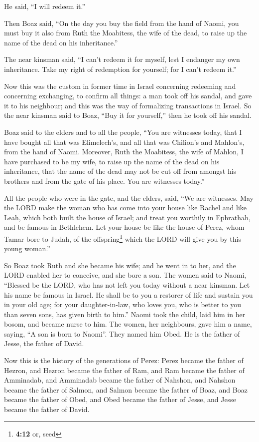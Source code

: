 He said, ``I will redeem it.''

 Then Boaz said, ``On the day you buy the field from the
hand of Naomi, you must buy it also from Ruth the Moabitess, the wife of
the dead, to raise up the name of the dead on his inheritance.''

 The near kinsman said, ``I can't redeem it for myself,
lest I endanger my own inheritance. Take my right of redemption for
yourself; for I can't redeem it.''

 Now this was the custom in former time in Israel
concerning redeeming and concerning exchanging, to confirm all things: a
man took off his sandal, and gave it to his neighbour; and this was the
way of formalizing transactions in Israel.  So the near
kinsman said to Boaz, ``Buy it for yourself,'' then he took off his
sandal.

 Boaz said to the elders and to all the people, ``You are
witnesses today, that I have bought all that was Elimelech's, and all
that was Chilion's and Mahlon's, from the hand of Naomi. 
Moreover, Ruth the Moabitess, the wife of Mahlon, I have purchased to be
my wife, to raise up the name of the dead on his inheritance, that the
name of the dead may not be cut off from amongst his brothers and from
the gate of his place. You are witnesses today.''

 All the people who were in the gate, and the elders,
said, ``We are witnesses. May the LORD make the woman who has come into
your house like Rachel and like Leah, which both built the house of
Israel; and treat you worthily in Ephrathah, and be famous in Bethlehem.
 Let your house be like the house of Perez, whom Tamar
bore to Judah, of the offspring\footnote{\textbf{4:12} or, seed} which
the LORD will give you by this young woman.''

 So Boaz took Ruth and she became his wife; and he went
in to her, and the LORD enabled her to conceive, and she bore a son.
 The women said to Naomi, ``Blessed be the LORD, who has
not left you today without a near kinsman. Let his name be famous in
Israel.  He shall be to you a restorer of life and
sustain you in your old age; for your daughter-in-law, who loves you,
who is better to you than seven sons, has given birth to him.''
 Naomi took the child, laid him in her bosom, and became
nurse to him.  The women, her neighbours, gave him a
name, saying, ``A son is born to Naomi''. They named him Obed. He is the
father of Jesse, the father of David.

 Now this is the history of the generations of Perez:
Perez became the father of Hezron,  and Hezron became the
father of Ram, and Ram became the father of Amminadab, 
and Amminadab became the father of Nahshon, and Nahshon became the
father of Salmon,  and Salmon became the father of Boaz,
and Boaz became the father of Obed,  and Obed became the
father of Jesse, and Jesse became the father of David.
